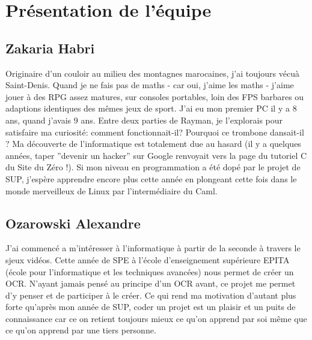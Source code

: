 \documentclass [french,12pt]{article}
\begin{document}
\section{Présentation de l'équipe}

\subsection{Zakaria Habri}

Originaire d’un couloir au milieu des montagnes marocaines, j’ai toujours vécuà Saint-Denis. Quand je ne fais pas de maths - car oui, j’aime les maths - j’aime jouer à des RPG assez matures, sur consoles portables, loin des FPS barbares ou adaptions identiques des mêmes jeux de sport. J’ai eu mon premier PC il y a 8 ans, quand j’avais 9 ans. Entre deux parties de Rayman, je l’explorais pour satisfaire ma curiosité: comment fonctionnait-il? Pourquoi ce trombone dansait-il ? Ma découverte de l’informatique est totalement due au hasard (il y a quelques années, taper ”devenir un hacker” sur Google renvoyait vers la page du tutoriel C du Site du Zéro !). Si mon niveau en programmation a été dopé par le projet de SUP, j'espère apprendre encore plus cette année en plongeant cette fois dans le monde merveilleux de Linux par l'intermédiaire du Caml.

\subsection{Ozarowski Alexandre}

J'ai commencé a m'intéresser à l'informatique à partir de la seconde à travers le sjeux vidéos. Cette année de SPE à l'école d'enseignement supérieure EPITA (école pour l'informatique et les techniques avancées) nous permet de créer un OCR. N'ayant jamais pensé au principe d'un OCR avant, ce projet me permet d'y penser et de participer à le créer. Ce qui rend ma motivation d'autant plus forte qu'après mon année de SUP, coder un projet est un plaisir et un puits de connaissance car ce on retient toujours mieux ce qu'on apprend par soi même que ce qu'on apprend par une tiers personne.

\subsection{}

\subsection{}
\end{document}
